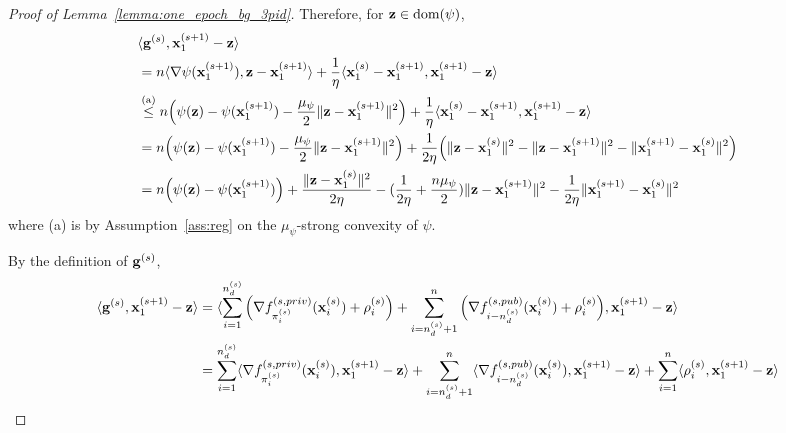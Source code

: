 \begin{proof}[Proof of Lemma~\ref{lemma:one_epoch_bg_3pid}]
    Therefore, for ${\mathbf{z}} \in \text{dom}(\psi)$,
    \begin{align}
        &\langle {\mathbf{g}}^{(s)}, {\mathbf{x}}_1^{(s+1)} - {\mathbf{z}} \rangle\\
        \nonumber
        &= n \langle \nabla \psi({\mathbf{x}}_1^{(s+1)}), {\mathbf{z}} - {\mathbf{x}}_1^{(s+1)}\rangle
        + \frac{1}{\eta}\langle {\mathbf{x}}_1^{(s)} - {\mathbf{x}}_1^{(s+1)}, {\mathbf{x}}_1^{(s+1)} - {\mathbf{z}}\rangle\\
        &\stackrel{\text{(a)}}{\leq} n\Big( \psi({\mathbf{z}}) - \psi({\mathbf{x}}_1^{(s+1)}) - \frac{\mu_\psi}{2}\|{\mathbf{z}} - {\mathbf{x}}_1^{(s+1)}\|^2\Big)
        + \frac{1}{\eta}\langle {\mathbf{x}}_1^{(s)} - {\mathbf{x}}_1^{(s+1)}, {\mathbf{x}}_1^{(s+1)} - {\mathbf{z}}\rangle\\
        &= n\Big( \psi({\mathbf{z}}) - \psi({\mathbf{x}}_1^{(s+1)}) - \frac{\mu_\psi}{2}\|{\mathbf{z}} - {\mathbf{x}}_1^{(s+1)}\|^2\Big)
        + \frac{1}{2\eta}\Big(\|{\mathbf{z}} - {\mathbf{x}}_1^{(s)}\|^2 - \|{\mathbf{z}} - {\mathbf{x}}_1^{(s+1)}\|^2 - \|{\mathbf{x}}_1^{(s+1)} - {\mathbf{x}}_1^{(s)}\|^2 \Big)\\
    \label{eq:dot_form_1}
        &= n\Big( \psi({\mathbf{z}}) - \psi({\mathbf{x}}_1^{(s+1)})\Big)
        + \frac{\|{\mathbf{z}} - {\mathbf{x}}_1^{(s)}\|^2}{2\eta} - (\frac{1}{2\eta} + \frac{n\mu_\psi}{2}) \|{\mathbf{z}} - {\mathbf{x}}_1^{(s+1)}\|^2
        - \frac{1}{2\eta}\|{\mathbf{x}}_1^{(s+1)} - {\mathbf{x}}_1^{(s)}\|^2
    \end{align}
    where (a) is by Assumption~\ref{ass:reg} on the $\mu_\psi$-strong convexity of $\psi$.

     By the definition of ${\mathbf{g}}^{(s)}$,
    \begin{align}
        \langle {\mathbf{g}}^{(s)}, {\mathbf{x}}_1^{(s+1)} - {\mathbf{z}}\rangle
        &= \langle \sum_{i=1}^{n_d^{(s)}}\Big( \nabla f_{\pi_i^{(s)}}^{(s, priv)}({\mathbf{x}}_i^{(s)}) 
        + \rho_i^{(s)}\Big)
        + \sum_{i=n_d^{(s)}+1}^{n} \Big(
            \nabla f_{i-n_d^{(s)}}^{(s, pub)}({\mathbf{x}}_i^{(s)})
            + \rho_i^{(s)}
        \Big)
        , {\mathbf{x}}_1^{(s+1)} - {\mathbf{z}}\rangle\\
    \label{eq:dot_interm}
        &= \sum_{i=1}^{n_d^{(s)}} \langle \nabla f_{\pi_i^{(s)}}^{(s, priv)}({\mathbf{x}}_i^{(s)}), {\mathbf{x}}_1^{(s+1)} - {\mathbf{z}}\rangle 
        + \sum_{i=n_d^{(s)}+1}^{n} \langle \nabla f_{i-n_d^{(s)}}^{(s, pub)}({\mathbf{x}}_i^{(s)}),
        {\mathbf{x}}_1^{(s+1)} - {\mathbf{z}}
        \rangle
        + \sum_{i=1}^{n}\langle \rho_i^{(s)}, {\mathbf{x}}_1^{(s+1)} - {\mathbf{z}}\rangle
    \end{align}


\end{proof}
